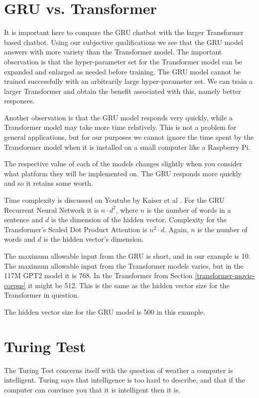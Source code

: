 

\section{GRU vs. Transformer}
It is important here to compare the GRU chatbot with the larger Transformer based chatbot. Using our subjective qualifications we see that the GRU model answers with more variety than the Transformer model. The important observation is that the hyper-parameter set for the Transformer model can be expanded and enlarged as needed before training. The GRU model cannot be trained successfully with an arbitrarily large hyper-parameter set. We can train a larger Transformer and obtain the benefit associated with this, namely better responses.

Another observation is that the GRU model responds very quickly, while a Transformer model may take more time relatively. This is not a problem for general applications, but for our purposes we cannot ignore the time spent by the Transformer model when it is installed on a small computer like a Raspberry Pi. 

The respective value of each of the models changes slightly when you consider what platform they will be implemented on. The GRU responds more quickly and so it retains some worth.

Time complexity is discussed on Youtube by Kaiser et al \cite{youtubeKaiser2017}. For the GRU Recurrent Neural Network it is $ n \cdot d^2 $, where $ n $ is the number of words in a sentence and $ d $ is the dimension of the hidden vector. Complexity for the Transformer's Scaled Dot Product Attention is $ n^2 \cdot  d $. Again, $n$ is the number of words and $d$ is the hidden vector's dimension. 

The maximum allowable input from the GRU is short, and in our example is 10. The maximum allowable input from the Transformer models varies, but in the 117M GPT2 model it is 768. In the Transformer from Section \ref{transformer-movie-corpus} it might be 512. This is the same as the hidden vector size for the Transformer in question.

The hidden vector size for the GRU model is 500 in this example.

\section{Turing Test}

The Turing Test concerns itself with the question of weather a computer is intelligent. Turing says that intelligence is too hard to describe, and that if the computer can convince you that it is intelligent then it is.

